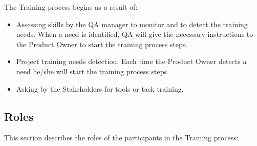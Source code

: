 \documentclass{template/openetcs_article}
\begin{document}
The Training process begins as a result of:
\begin{itemize}
\item Assessing skills by the QA manager to monitor and to detect the training needs. When a need is identified, QA will give the necessary instructions to the Product Owner to start the training process steps. 
\item Project training needs detection. Each time the Product Owner detects a need he/she will start the training process steps
\item Asking by the Stakeholders for tools or task training. 
\end{itemize}


\subsection{Roles}

This section describes the roles of the participants in the Training process:
\end{document}
